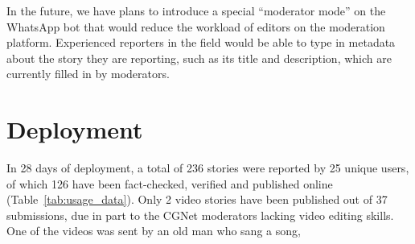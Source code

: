 In the future, we have plans to introduce a special ``moderator mode'' on the WhatsApp bot that would reduce the workload of editors on the moderation platform. Experienced reporters in the field would be able to type in metadata about the story they are reporting, such as its title and description, which are currently filled in by moderators.








% 
\section{Deployment}

In 28 days of deployment, a total of 236 stories were reported by 25 unique users, of which 126 have been fact-checked, verified and published online (Table~\ref{tab:usage_data}). Only 2 video stories have been published out of 37 submissions, due in part to the CGNet moderators lacking video editing skills. One of the videos was sent by an old man who sang a song,

